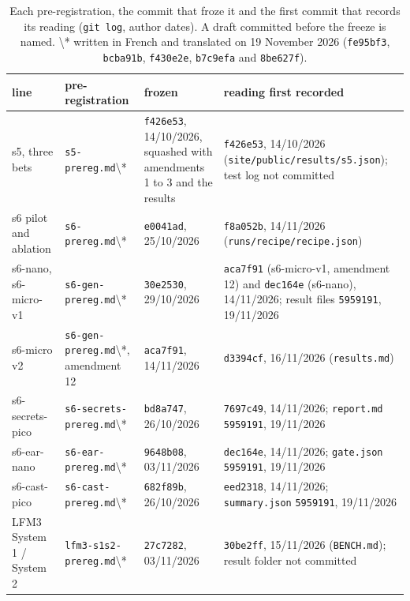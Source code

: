 \documentclass[10pt]{article}
\renewcommand{\arraystretch}{1.15}
\begin{document}
\begin{table}[p]
\centering
\footnotesize
\setlength{\tabcolsep}{4pt}\renewcommand{\arraystretch}{1.05}
\caption[Each pre-registration, the commit that froze it and the first commit that records its reading (\texttt{git log}, author dates).]{Each pre-registration, the commit that froze it and the first commit that records its reading (\texttt{git log}, author dates). A draft committed before the freeze is named. \textbackslash{}* written in French and translated on 19 November 2026 (\texttt{fe95bf3}, \texttt{bcba91b}, \texttt{f430e2e}, \texttt{b7c9efa} and \texttt{8be627f}).}\label{tab:A1}
\begin{tabularx}{\linewidth}{@{}P{2.35cm}P{3.55cm}LL@{}}
\toprule
line & pre-registration & frozen & reading first recorded \\
\midrule
s5, three bets & \texttt{s5-prereg.md}\textbackslash{}* & \texttt{f426e53}, 14/10/2026, squashed with amendments 1 to 3 and the results & \texttt{f426e53}, 14/10/2026 (\texttt{site/\allowbreak{}public/\allowbreak{}results/\allowbreak{}s5.json}); test log not committed \\
s6 pilot and ablation & \texttt{s6-prereg.md}\textbackslash{}* & \texttt{e0041ad}, 25/10/2026 & \texttt{f8a052b}, 14/11/2026 (\texttt{runs/\allowbreak{}recipe/\allowbreak{}recipe.json}) \\
s6-nano, s6-micro-v1 & \texttt{s6-gen-prereg.md}\textbackslash{}* & \texttt{30e2530}, 29/10/2026 & \texttt{aca7f91} (s6-micro-v1, amendment 12) and \texttt{dec164e} (s6-nano), 14/11/2026; result files \texttt{5959191}, 19/11/2026 \\
s6-micro v2 & \texttt{s6-gen-prereg.md}\textbackslash{}*, amendment 12 & \texttt{aca7f91}, 14/11/2026 & \texttt{d3394cf}, 16/11/2026 (\texttt{results.md}) \\
s6-secrets-pico & \texttt{s6-secrets-prereg.md}\textbackslash{}* & \texttt{bd8a747}, 26/10/2026 & \texttt{7697c49}, 14/11/2026; \texttt{report.md} \texttt{5959191}, 19/11/2026 \\
s6-ear-nano & \texttt{s6-ear-prereg.md}\textbackslash{}* & \texttt{9648b08}, 03/11/2026 & \texttt{dec164e}, 14/11/2026; \texttt{gate.json} \texttt{5959191}, 19/11/2026 \\
s6-cast-pico & \texttt{s6-cast-prereg.md}\textbackslash{}* & \texttt{682f89b}, 26/10/2026 & \texttt{eed2318}, 14/11/2026; \texttt{summary.json} \texttt{5959191}, 19/11/2026 \\
LFM3 System 1 / System 2 & \texttt{lfm3-s1s2-prereg.md}\textbackslash{}* & \texttt{27c7282}, 03/11/2026 & \texttt{30be2ff}, 15/11/2026 (\texttt{BENCH.md}); result folder not committed \\

\end{tabularx}
\end{table}
\end{document}
